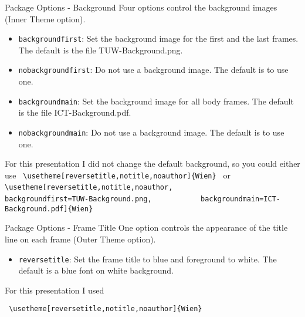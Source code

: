 \documentclass{beamer}
\begin{document}
\begin{frame}[fragile]{Package Options - Background}
   Four options control the background images (Inner Theme option).
  
\begin{itemize}
\item \texttt{backgroundfirst}: Set the background image for the first and the last frames. The default is the file TUW-Background.png.
\item \texttt{nobackgroundfirst}: Do not use a background image. The default is to use one.
\item \texttt{backgroundmain}: Set the background image for all body frames. The default is the file ICT-Background.pdf.
\item \texttt{nobackgroundmain}: Do not use a background image. The default is to use one.
\end{itemize}

For this presentation I did not change the default background, so you could either use
\verb| \usetheme[reversetitle,notitle,noauthor]{Wien} |
or
\verb| \usetheme[reversetitle,notitle,noauthor,|
\verb|           backgroundfirst=TUW-Background.png,|
\verb|           backgroundmain=ICT-Background.pdf]{Wien} |

\end{frame}
\begin{frame}[fragile]{Package Options - Frame Title}
   One option controls the appearance of the title line on each frame (Outer Theme option).
  
\begin{itemize}
\item \texttt{reversetitle}: Set the frame title to blue and
  foreground to white. The default is a blue font on white background.
\end{itemize}

For this presentation I used

\verb| \usetheme[reversetitle,notitle,noauthor]{Wien} |

\end{frame}
\end{document}
